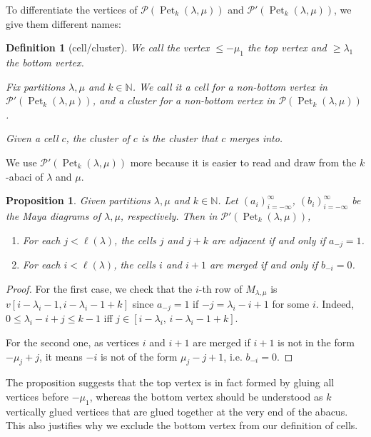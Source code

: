 \documentclass[pdflatex,sn-mathphys-num]{sn-jnl}%
\theoremstyle{thmstyleone}%
\newtheorem{proposition}[theorem]{Proposition}
\theoremstyle{thmstyletwo}%
\theoremstyle{thmstylethree}%
\newtheorem{definition}[theorem]{Definition}
\numberwithin{equation}{section}
\newcommand{\N}{\mathbb{N}}
\DeclareMathOperator{\Pet}{Pet}
\begin{document}
        To differentiate the vertices of $\mathcal{P}(\Pet_k(\lambda,\mu))$ and $\mathcal{P}'(\Pet_k(\lambda,\mu))$, we give them different names:
            
	\begin{definition}[cell/cluster]
            We call the vertex $\leq -\mu_1$ the \emph{top vertex} and $\geq \lambda_1$ the \emph{bottom vertex}.
            
            Fix partitions $\lambda,\mu$ and $k\in \N$. We call it a \emph{cell} for a non-bottom vertex in $\mathcal{P}'(\Pet_k(\lambda,\mu))$, and a \emph{cluster} for a non-bottom vertex in $\mathcal{P}(\Pet_k(\lambda,\mu))$.
            
            Given a cell $c$, the cluster of $c$ is the cluster that $c$ merges into.
	\end{definition}
         
        We use $\mathcal{P}'(\Pet_k(\lambda,\mu))$ more because it is easier to read and draw from the $k$-abaci of $\lambda$ and $\mu$. 
	\begin{proposition}\label{prop:PetrieAbacus}
		Given partitions $\lambda,\mu$ and $k\in \N$. Let $(a_i)_{i=-\infty}^\infty$, $(b_i)_{i=-\infty}^{\infty}$ be the Maya diagrams of $\lambda,\mu$, respectively. Then in $\mathcal{P}'(\Pet_k(\lambda,\mu))$,
		\begin{enumerate}
			\item For each $j< \ell(\lambda)$, the cells $j$ and $j+k$ are adjacent if and only if $a_{-j}=1$.
			\item For each $i< \ell(\lambda)$, the cells $i$ and $i+1$ are merged if and only if $b_{-i}=0$.
		\end{enumerate}
	\end{proposition}
	\begin{proof}
            For the first case, we check that the $i$-th row of $M_{\lambda,\mu}$ is $v[i-\lambda_i-1, i-\lambda_i-1+k]$ since $a_{-j}=1$ if $-j=\lambda_i-i+1$ for some $i$. Indeed, $0\leq \lambda_i-i+j\leq k-1$ iff $j\in [i-\lambda_i,\, i-\lambda_i-1+k]$.

            For the second one, as vertices $i$ and $i+1$ are merged if $i+1$ is not in the form $-\mu_j+j$, it means $-i$ is not of the form $\mu_j-j+1$, i.e. $b_{-i}=0$.
	\end{proof}

    The proposition suggests that the top vertex is in fact formed by gluing all vertices before $-\mu_1$, whereas the bottom vertex should be understood as $k$ vertically glued vertices that are glued together at the very end of the abacus. This also justifies why we exclude the bottom vertex from our definition of cells.
\end{document}
